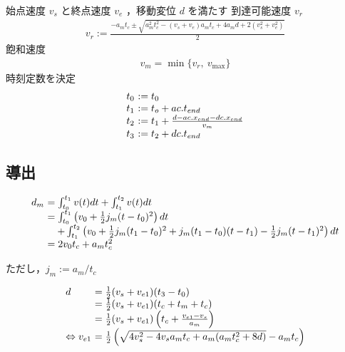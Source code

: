\documentclass[a5paper]{ltjsarticle}
\begin{document}
始点速度 $v_s$ と終点速度 $v_e$ ，移動変位 $d$ を満たす
到達可能速度 $v_r$
\begin{align}
    v_r := \frac{-a_mt_c \pm \sqrt{a_m^2t_c^2-(v_s+v_e)a_mt_c+4a_md+2(v_s^2+v_e^2)}}{2}
\end{align}
飽和速度
\begin{align}
    v_m = \min\{v_r,~v_{\max} \}
\end{align}
時刻定数を決定
\begin{align}
    \begin{array}{l@{~}l}
        t_0 & := t_0
        \\
        t_1 & := t_o + ac.t_{end}
        \\
        t_2 & := t_1 + \frac{d - ac.x_{end} - dc.x_{end}}{v_m}
        \\
        t_3 & := t_2 + dc.t_{end}
    \end{array}
\end{align}

\subsection{導出}

$$
    \begin{array}{l@{~}l}
        d_m & =                  \int_{t_0}^{t_1}v(t) dt + \int_{t_1}^{t_2}v(t) dt
        \\
            & =                  \int_{t_0}^{t_1}\left( v_0+\frac{1}{2} j_m(t-t_0)^2 \right) dt
        \\
            & \quad+ \int_{t_1}^{t_2}\left(
        v_0+                     \frac{1}{2} j_m(t_1-t_0)^2
        +j_m(t_1-t_0)(t-t_1) -   \frac{1}{2}j_m(t-t_1)^2
        \right) dt
        \\
            & = 2v_0t_c+a_mt_c^2
    \end{array}
$$

ただし，$j_m:=a_m/t_c$

$$
    \begin{array}{l@{~}l}
        d                      & = \frac{1}{2}(v_s+v_{e1})(t_3-t_0)
        \\
                               & = \frac{1}{2}(v_s+v_{e1})(t_c+t_m+t_c)
        \\
                               & = \frac{1}{2}(v_s+v_{e1})\left(t_c+\frac{v_{e1}-v_s}{a_m}\right)
        \\
        \Leftrightarrow v_{e1} & =
        \frac{1}{2}\left(\sqrt{4v_s^2-4v_sa_mt_c+a_m(a_mt_c^2+8d)}-a_mt_c\right)
    \end{array}
$$
\end{document}
